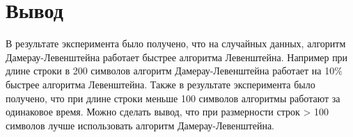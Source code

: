 \section*{Вывод}

В результате эксперимента было получено, что на случайных данных, алгоритм Дамерау-Левенштейна работает быстрее алгоритма Левенштейна. Например при длине строки в 200 символов алгоритм Дамерау-Левенштейна работает на 10$\%$ быстрее алгоритма Левенштейна. Также в результате эксперимента было получено, что при длине строки меньше 100 символов алгоритмы работают за одинаковое время. Можно сделать вывод, что при размерности строк > 100 символов лучше использовать алгоритм Дамерау-Левенштейна.